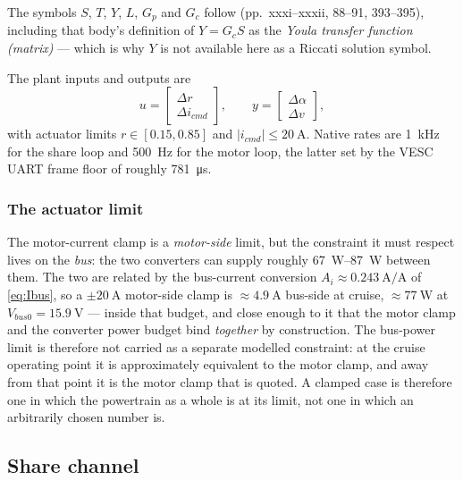 \documentclass[energies,article,submit,pdftex,oneauthor]{Definitions/mdpi}
\begin{document}
The symbols $S$, $T$, $Y$, $L$, $G_p$ and $G_c$ follow \citep{assadian2020neoclassical}
(pp.~xxxi--xxxii, 88--91, 393--395), including that body's definition of $Y = G_c S$ as the
\emph{Youla transfer function (matrix)} --- which is why $Y$ is not available here as a Riccati
solution symbol.

The plant inputs and outputs are
\begin{equation}\label{eq:io}
u = \begin{bmatrix} \Delta r \\ \Delta i_{cmd} \end{bmatrix}, \qquad
y = \begin{bmatrix} \Delta \alpha \\ \Delta v \end{bmatrix},
\end{equation}
with actuator limits $r\in[0.15,0.85]$ and $|i_{cmd}|\le\SI{20}{\ampere}$. Native rates are
\SI{1}{\kilo\hertz} for the share loop and \SI{500}{\hertz} for the motor loop, the latter set by
the VESC UART frame floor of roughly \SI{781}{\micro\second}.

\subsubsection{The actuator limit}
The motor-current clamp is a \emph{motor-side} limit, but the constraint it must respect lives on
the \emph{bus}: the two converters can supply roughly \SIrange{67}{87}{\watt} between them. The
two are related by the bus-current conversion $A_i \approx
\SI{0.243}{\ampere\per\ampere}$ of \eqref{eq:Ibus}, so a $\pm\SI{20}{\ampere}$ motor-side clamp is
$\approx\SI{4.9}{\ampere}$ bus-side at cruise, $\approx\SI{77}{\watt}$ at
$V_{bus0} = \SI{15.9}{\volt}$ --- inside that budget, and close enough to it that the motor clamp
and the converter power budget bind \emph{together} by construction. The bus-power limit is
therefore not carried as a separate modelled constraint: at the cruise operating point it is
approximately equivalent to the motor clamp, and away from that point it is the motor clamp that
is quoted. A clamped case is therefore one in which the powertrain as a whole is at its limit, not
one in which an arbitrarily chosen number is.

\subsection{Share channel}
\end{document}
